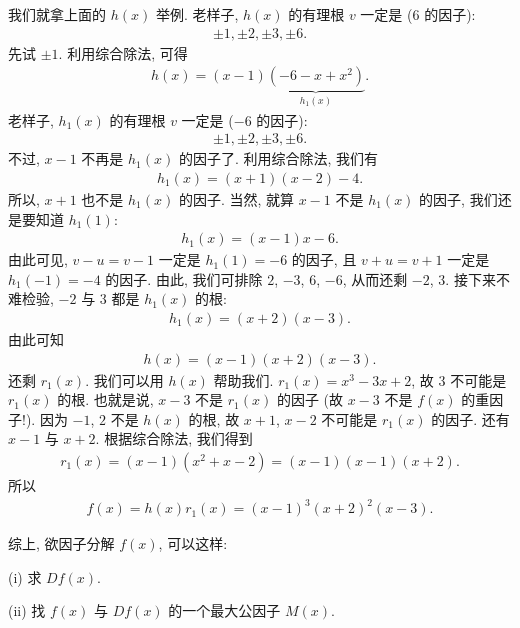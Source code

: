 \begin{example}
    我们就拿上面的 $h(x)$ 举例. 老样子, $h(x)$ 的有理根 $v$ 一定是 ($6$ 的因子):
    \begin{align*}
        \pm 1, \pm 2, \pm 3, \pm 6.
    \end{align*}
    先试 $\pm 1$. 利用综合除法, 可得
    \begin{align*}
        h(x) = (x - 1) \underbrace{(-6 - x + x^2)}_{h_1 (x)}.
    \end{align*}
    老样子, $h_1 (x)$ 的有理根 $v$ 一定是 ($-6$ 的因子):
    \begin{align*}
        \pm 1, \pm 2, \pm 3, \pm 6.
    \end{align*}
    不过, $x-1$ 不再是 $h_1 (x)$ 的因子了. 利用综合除法, 我们有
    \begin{align*}
        h_1 (x) = (x + 1) (x - 2) - 4.
    \end{align*}
    所以, $x+1$ 也不是 $h_1 (x)$ 的因子. 当然, 就算 $x-1$ 不是 $h_1 (x)$ 的因子, 我们还是要知道 $h_1 (1)$:
    \begin{align*}
        h_1 (x) = (x - 1) x - 6.
    \end{align*}
    由此可见, $v - u = v - 1$ 一定是 $h_1 (1) = -6$ 的因子, 且 $v + u = v + 1$ 一定是 $h_1 (-1) = -4$ 的因子. 由此, 我们可排除 $2$, $-3$, $6$, $-6$, 从而还剩 $-2$, $3$. 接下来不难检验, $-2$ 与 $3$ 都是 $h_1 (x)$ 的根:
    \begin{align*}
        h_1 (x) = (x + 2) (x - 3).
    \end{align*}
    由此可知
    \begin{align*}
        h(x) = (x - 1) (x + 2) (x - 3).
    \end{align*}
    还剩 $r_1 (x)$. 我们可以用 $h(x)$ 帮助我们. $r_1 (x) = x^3 - 3x + 2$, 故 $3$ 不可能是 $r_1 (x)$ 的根. 也就是说, $x - 3$ 不是 $r_1 (x)$ 的因子 (故 $x - 3$ 不是 $f(x)$ 的重因子!). 因为 $-1$, $2$ 不是 $h(x)$ 的根, 故 $x+1$, $x-2$ 不可能是 $r_1 (x)$ 的因子. 还有 $x - 1$ 与 $x + 2$. 根据综合除法, 我们得到
    \begin{align*}
        r_1 (x) = (x - 1) (x^2 + x - 2) = (x - 1) (x - 1) (x + 2).
    \end{align*}
    所以
    \begin{align*}
        f(x) = h(x) r_1 (x) = (x-1)^3 (x+2)^2 (x-3).
    \end{align*}
\end{example}

综上, 欲因子分解 $f(x)$, 可以这样:

(i) 求 $Df(x)$.

(ii) 找 $f(x)$ 与 $Df(x)$ 的一个最大公因子 $M(x)$.


